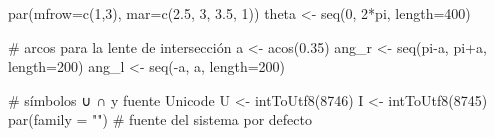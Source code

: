 \documentclass[
  letterpaper,
  DIV=11,
  numbers=noendperiod]{scrartcl}
\newenvironment{Shaded}{\begin{snugshade}}{\end{snugshade}}
\newcommand{\AttributeTok}[1]{\textcolor[rgb]{0.40,0.45,0.13}{#1}}
\newcommand{\CommentTok}[1]{\textcolor[rgb]{0.37,0.37,0.37}{#1}}
\newcommand{\DecValTok}[1]{\textcolor[rgb]{0.68,0.00,0.00}{#1}}
\newcommand{\FloatTok}[1]{\textcolor[rgb]{0.68,0.00,0.00}{#1}}
\newcommand{\FunctionTok}[1]{\textcolor[rgb]{0.28,0.35,0.67}{#1}}
\newcommand{\NormalTok}[1]{\textcolor[rgb]{0.00,0.23,0.31}{#1}}
\newcommand{\OtherTok}[1]{\textcolor[rgb]{0.00,0.23,0.31}{#1}}
\newcommand{\SpecialCharTok}[1]{\textcolor[rgb]{0.37,0.37,0.37}{#1}}
\newcommand{\StringTok}[1]{\textcolor[rgb]{0.13,0.47,0.30}{#1}}
\begin{document}
\begin{Shaded}
\begin{Highlighting}[]
\FunctionTok{par}\NormalTok{(}\AttributeTok{mfrow=}\FunctionTok{c}\NormalTok{(}\DecValTok{1}\NormalTok{,}\DecValTok{3}\NormalTok{), }\AttributeTok{mar=}\FunctionTok{c}\NormalTok{(}\FloatTok{2.5}\NormalTok{, }\DecValTok{3}\NormalTok{, }\FloatTok{3.5}\NormalTok{, }\DecValTok{1}\NormalTok{))}
\NormalTok{theta }\OtherTok{\textless{}{-}} \FunctionTok{seq}\NormalTok{(}\DecValTok{0}\NormalTok{, }\DecValTok{2}\SpecialCharTok{*}\NormalTok{pi, }\AttributeTok{length=}\DecValTok{400}\NormalTok{)}

\CommentTok{\# arcos para la lente de intersección}
\NormalTok{a }\OtherTok{\textless{}{-}} \FunctionTok{acos}\NormalTok{(}\FloatTok{0.35}\NormalTok{)}
\NormalTok{ang\_r }\OtherTok{\textless{}{-}} \FunctionTok{seq}\NormalTok{(pi}\SpecialCharTok{{-}}\NormalTok{a, pi}\SpecialCharTok{+}\NormalTok{a, }\AttributeTok{length=}\DecValTok{200}\NormalTok{)}
\NormalTok{ang\_l }\OtherTok{\textless{}{-}} \FunctionTok{seq}\NormalTok{(}\SpecialCharTok{{-}}\NormalTok{a, a, }\AttributeTok{length=}\DecValTok{200}\NormalTok{)}

\CommentTok{\# símbolos ∪ ∩ y fuente Unicode}
\NormalTok{U }\OtherTok{\textless{}{-}} \FunctionTok{intToUtf8}\NormalTok{(}\DecValTok{8746}\NormalTok{)}
\NormalTok{I }\OtherTok{\textless{}{-}} \FunctionTok{intToUtf8}\NormalTok{(}\DecValTok{8745}\NormalTok{)}
\FunctionTok{par}\NormalTok{(}\AttributeTok{family =} \StringTok{""}\NormalTok{)   }\CommentTok{\# fuente del sistema por defecto}


\end{Highlighting}
\end{Shaded}
\end{document}
